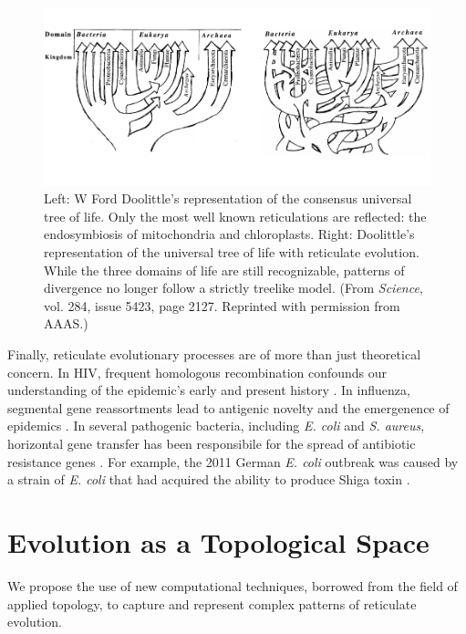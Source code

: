 \begin{figure}
\centering
\includegraphics[]{./fig/introduction/doolittle_trees.pdf}
\caption[Ford Doolittle's Reticulate Tree of Life]{Left: W Ford Doolittle's representation of the consensus universal tree of life. Only the most well known reticulations are reflected: the endosymbiosis of mitochondria and chloroplasts. Right: Doolittle's representation of the universal tree of life with reticulate evolution. While the three domains of life are still recognizable, patterns of divergence no longer follow a strictly treelike model. (From \emph{Science}, vol. 284, issue 5423, page 2127. Reprinted with permission from AAAS.)}
\label{fig:doolittle_tree}
\end{figure}

Finally, reticulate evolutionary processes are of more than just theoretical concern.
In HIV, frequent homologous recombination confounds our understanding of the epidemic's early and present history \cite{Burke:1997ep}.
In influenza, segmental gene reassortments lead to antigenic novelty and the emergenence of epidemics \cite{Nelson:2007bc}.
In several pathogenic bacteria, including \emph{E. coli} and \emph{S. aureus}, horizontal gene transfer has been responsibile for the spread of antibiotic resistance genes \cite{Alekshun:2007bq,Davies:2010dv}.
For example, the 2011 German \emph{E. coli} outbreak was caused by a strain of \emph{E. coli} that had acquired the ability to produce Shiga toxin \cite{Rohde:2011ju}.

\section{Evolution as a Topological Space}

We propose the use of new computational techniques, borrowed from the field of applied topology, to capture and represent complex patterns of reticulate evolution.

